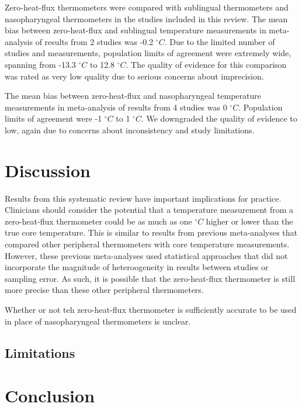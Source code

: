 \documentclass[smallextended]{svjour3}       %
\begin{document}
Zero-heat-flux thermometers were compared with sublingual thermometers
and nasopharyngeal thermometers in the studies included in this review.
The mean bias between zero-heat-flux and sublingual temperature
measurements in meta-analysis of results from 2 studies was -0.2
\(^\circ C\). Due to the limited number of studies and measurements,
population limits of agreement were extremely wide, spanning from -13.3
\(^\circ C\) to 12.8 \(^\circ C\). The quality of evidence for this
comparison was rated as very low quality due to serious concerns about
imprecision.

The mean bias between zero-heat-flux and nasopharyngeal temperature
measurements in meta-analysis of results from 4 studies was 0
\(^\circ C\). Population limits of agreement were -1 \(^\circ C\) to 1
\(^\circ C\). We downgraded the quality of evidence to low, again due to
concerns about inconsistency and study limitations.

\hypertarget{discussion}{%
\section{Discussion}\label{discussion}}

Results from this systematic review have important implications for
practice. Clinicians should consider the potential that a temperature
measurement from a zero-heat-flux thermometer could be as much as one
\(^\circ C\) higher or lower than the true core temperature. This is
similar to results from previous meta-analyses that compared other
peripheral thermometers with core temperature measurements. However,
these previous meta-analyses used statistical approaches that did not
incorporate the magnitude of heteroogeneity in results between studies
or sampling error. As such, it is possible that the zero-heat-flux
thermometer is still more precise than these other peripheral
thermometers.

Whether or not teh zero-heat-flux thermometer is sufficiently accurate
to be used in place of nasopharyngeal thermometers is unclear.

\hypertarget{limitations}{%
\subsection{Limitations}\label{limitations}}

\hypertarget{conclusion}{%
\section{Conclusion}\label{conclusion}}
\end{document}
